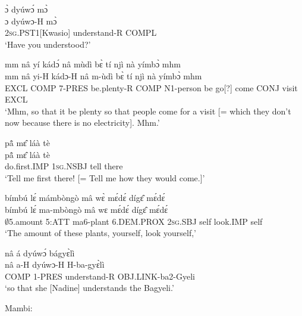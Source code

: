 \begin{exe} 
\exC\label{206}
  \glll ɔ̀ dyúwɔ́ mɔ̀ \\
        ɔ dyúwɔ-H mɔ̀ \\
        2\textsc{sg}.PST1[Kwasio] understand-R COMPL  \\
    \trans `Have you understood?'
\end{exe}

\begin{exe} 
\exC\label{207}
  \glll mm nâ yí kádɔ́ nâ mùdì bɛ̀ tí njì nà yímbɔ̀ mhm \\
        mm nâ yi-H kádɔ-H nâ m-ùdì bɛ̀ tí njì nà yímbɔ̀ mhm \\
        EXCL COMP 7-PRES be.plenty-R COMP N1-person be go[?] come CONJ visit EXCL \\
    \trans `Mhm, so that it be plenty so that people come for a visit [= which they don't now because there is no electricity]. Mhm.'
\end{exe}

\begin{exe} 
\exC\label{208}
  \glll pã̂ mɛ̂ láà tè  \\
      pã̂ mɛ̂ láà tè \\
        do.first.IMP 1\textsc{sg}.NSBJ tell there  \\
    \trans `Tell me first there! [= Tell me how they would come.]'
\end{exe}

\begin{exe} 
\exC\label{209}
  \glll bímbú lɛ́ mámbòngò mâ wɛ̀ mɛ́dɛ́ dígɛ̂ mɛ́dɛ́ \\
         bímbú lɛ́ ma-mbòngò mâ wɛ mɛ́dɛ́ dígɛ̂ mɛ́dɛ́ \\
       $\emptyset$5.amount 5:ATT ma6-plant 6.DEM.PROX 2\textsc{sg}.SBJ self look.IMP self   \\
    \trans `The amount of these plants, yourself, look yourself,'
\end{exe}

\begin{exe} 
\exC\label{210} 
  \glll nâ á dyúwɔ́ bágyɛ̀lì \\
         nâ a-H dyúwɔ-H H-ba-gyɛ̀lì \\
         COMP 1-PRES understand-R OBJ.LINK-ba2-Gyeli \\
    \trans `so that she [Nadine] understands the Bagyeli.'
\end{exe}

\noindent Mambi:

